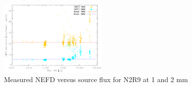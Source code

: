 \begin{figure}
\begin{center}
\includegraphics[clip=true,width=0.47\textwidth]{Figures/NEFDIndScans/nefd_flux1mm_run22.pdf}
\caption[Measured NEFD versus source flux for N2R9 at 1 and 2 mm]{Measured NEFD
  versus source flux for N2R9 at 1 and 2 mm}
\label{fig:nefdvsbackground}
\end{center}
\end{figure}

